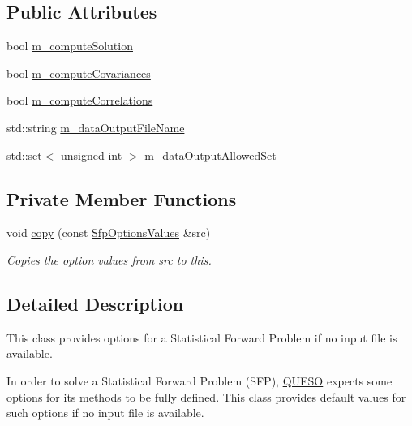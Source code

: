 \subsection*{Public Attributes}
\begin{DoxyCompactItemize}
\item 
bool \hyperlink{class_q_u_e_s_o_1_1_sfp_options_values_a087c7e28e7c72ee99d5722f75e43c8bb}{m\-\_\-compute\-Solution}
\item 
bool \hyperlink{class_q_u_e_s_o_1_1_sfp_options_values_abe755434941b852aaf5bd512c153354b}{m\-\_\-compute\-Covariances}
\item 
bool \hyperlink{class_q_u_e_s_o_1_1_sfp_options_values_a4de46169004d9ccbe66fdf32ae93ea45}{m\-\_\-compute\-Correlations}
\item 
std\-::string \hyperlink{class_q_u_e_s_o_1_1_sfp_options_values_ad6028c5dff00b18d5085045c3a6d135e}{m\-\_\-data\-Output\-File\-Name}
\item 
std\-::set$<$ unsigned int $>$ \hyperlink{class_q_u_e_s_o_1_1_sfp_options_values_a51d0f0da7a29dfb12340d863e2f980a0}{m\-\_\-data\-Output\-Allowed\-Set}
\end{DoxyCompactItemize}
\subsection*{Private Member Functions}
\begin{DoxyCompactItemize}
\item 
void \hyperlink{class_q_u_e_s_o_1_1_sfp_options_values_ad3e0b2e03abf1e2ca7b767fef7512af7}{copy} (const \hyperlink{class_q_u_e_s_o_1_1_sfp_options_values}{Sfp\-Options\-Values} \&src)
\begin{DoxyCompactList}\small\item\em Copies the option values from {\ttfamily src} to {\ttfamily this}. \end{DoxyCompactList}\end{DoxyCompactItemize}


\subsection{Detailed Description}
This class provides options for a Statistical Forward Problem if no input file is available. 

In order to solve a Statistical Forward Problem (S\-F\-P), \hyperlink{namespace_q_u_e_s_o}{Q\-U\-E\-S\-O} expects some options for its methods to be fully defined. This class provides default values for such options if no input file is available. 


